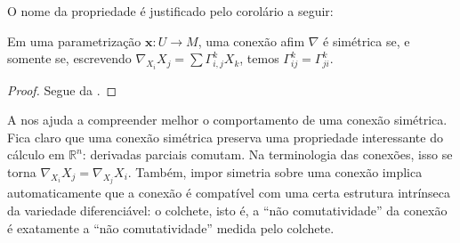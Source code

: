 O nome da propriedade é justificado pelo corolário a seguir:
\begin{corollary}
	\label{cor:conexao-simetrica}
	Em uma parametrização $\mathbf{x}:U\to M$, uma conexão afim $\nabla$ é simétrica se, e somente se, escrevendo $\nabla_{X_{i}}X_{j}=\sum \Gamma_{i,j}^{k}X_{k}$, temos $\Gamma_{ij}^{k}=\Gamma_{ji}^{k}$.
	\begin{proof}

		Segue da .
	\end{proof}
\end{corollary}
A  nos ajuda a compreender melhor o comportamento de uma conexão simétrica. Fica claro que uma conexão simétrica preserva uma propriedade interessante do cálculo em $\mathbb{R}^{n}$: derivadas parciais comutam. Na terminologia das conexões, isso se torna $\nabla_{X_{i}}X_{j}=\nabla_{X_{j}}X_{i}$. Também, impor simetria sobre uma conexão implica automaticamente que a conexão é compatível com uma certa estrutura intrínseca da variedade diferenciável: o colchete, isto é, a ``não comutatividade'' da conexão é exatamente a ``não comutatividade'' medida pelo colchete.

